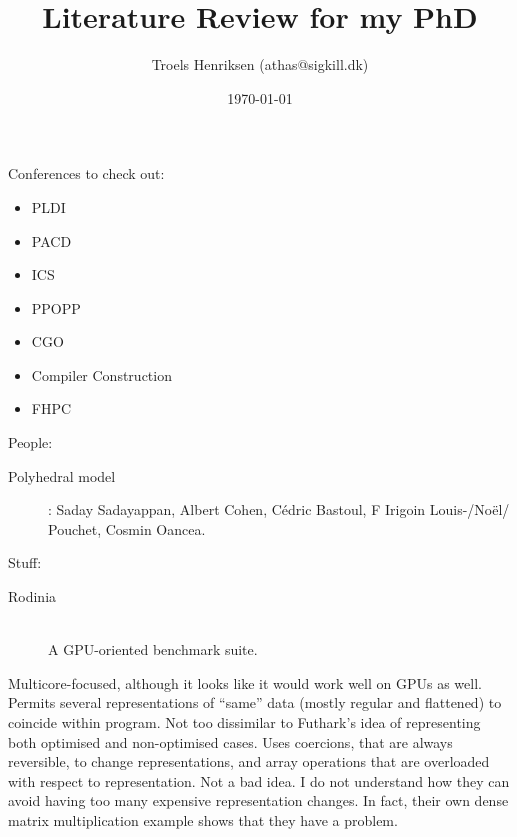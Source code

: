 \documentclass[a4paper, oneside, final]{memoir}
\title{Literature Review for my PhD}
\author{Troels Henriksen (athas@sigkill.dk)}
\date{\today}
\begin{document}
\frontmatter

\maketitle
\thispagestyle{empty}

Conferences to check out:

\begin{itemize}
\item PLDI
\item PACD
\item ICS
\item PPOPP
\item CGO
\item Compiler Construction
\item FHPC
\end{itemize}

People:

\begin{description}
\item[Polyhedral model]: Saday Sadayappan, Albert Cohen, Cédric
  Bastoul, F Irigoin Louis-/Noël/ Pouchet, Cosmin Oancea.
\end{description}

Stuff:

\begin{description}
\item[Rodinia]\hfill\\ A GPU-oriented benchmark suite.
\end{description}

\begin{quote}
\end{quote}

Multicore-focused, although it looks like it would work well on GPUs
as well.  Permits several representations of ``same'' data (mostly
regular and flattened) to coincide within program.  Not too dissimilar
to Futhark's idea of representing both optimised and non-optimised
cases.  Uses coercions, that are always reversible, to change
representations, and array operations that are overloaded with respect
to representation.  Not a bad idea.  I do not understand how they can
avoid having too many expensive representation changes.  In fact,
their own dense matrix multiplication example shows that they have a
problem.

\begin{quote}
\end{quote}
\end{document}
